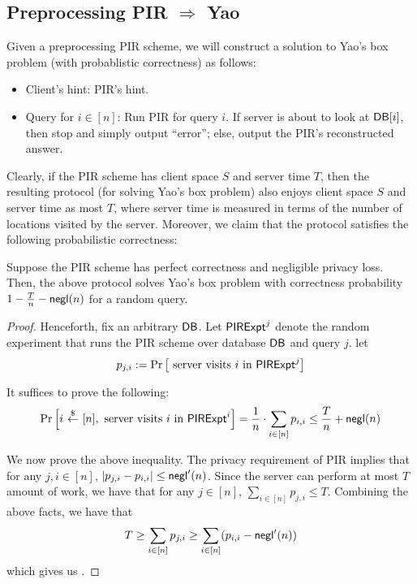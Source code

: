 \subsection{Preprocessing PIR  $\Longrightarrow$ Yao} 
\label{sec:pirtoyao}
Given a preprocessing PIR scheme, 
we will construct a solution to Yao's box problem (with probablistic
correctness) as follows:

\begin{itemize}[leftmargin=6mm]
    \item Client's hint: PIR's hint.
    \item Query for $i \in [n]$: Run PIR for query $i$. 
If server is about to look at ${\sf DB}[i]$, then stop and 
simply output ``error''; else,
output the PIR's reconstructed answer.
\end{itemize}

Clearly, if the PIR scheme has client space $S$
and server time $T$, 
then the resulting protocol (for solving Yao's box problem)
also enjoys client space $S$
and server time as most $T$, where server time 
is measured in terms of the number of locations visited by the server.
Moreover, we claim that the protocol
satisfies the following probabilistic correctness: 


\begin{claim}
Suppose the PIR scheme has perfect
correctness and negligible privacy loss.  
Then, 
the above protocol solves Yao's box problem
with 
correctness probability 
$1 - \frac{T}{n} - {\sf negl}(n)$ for a random query.
\end{claim}
\begin{proof}
Henceforth, fix an arbitrary ${\sf DB}$. 
Let ${\sf PIRExpt}^{j}$
denote the random experiment 
that runs the PIR scheme over database ${\sf DB}$ and query $j$.
let 
\[
p_{j, i} := 
\Pr\left[
\text{ server visits $i$ in ${\sf PIRExpt}^{j}$}
\right]
\]

It suffices to prove 
the following:
\begin{equation}
\Pr\left[
i \getr [n], %
\text{ server visits $i$ in ${\sf PIRExpt}^{i}$}
\right]
 = \frac{1}{n} \cdot \sum_{i \in [n]}  p_{i, i}
\leq \frac{T}{n} + \negl(n)
\label{eqn:goal}
\end{equation} 

We now prove the above inequality.
The privacy requirement of PIR implies 
that for any $j, i \in [n]$, 
$|p_{j, i} - p_{i, i}| \leq {\sf negl}'(n)$.
Since the server can perform at most $T$ amount of work, we have that
for any $ j \in [n]$, $\sum_{i \in [n]} p_{j, i} \leq T$. 
Combining the above facts, we have that 
\[
T \geq 
\sum_{i \in [n]} p_{j, i} 
\geq \sum_{i \in [n]} (p_{i, i} - {\sf negl}'(n))
\]
which gives us .
\end{proof}

